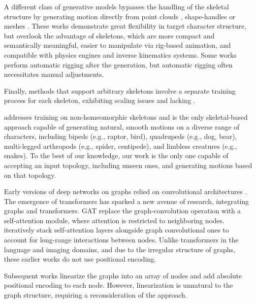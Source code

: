 A different class of generative models bypasses the handling of the skeletal structure by generating motion directly from point clouds \cite{mo2025motion}, shape-handles \cite{zhang2023tapmo} or meshes \cite{song2023unsupervised,ye2024skinned,muralikrishnan2025temporal,zhang2024dnf}. These works demonstrate great flexibility in target character structure, but overlook the advantage of skeletons, which are more compact and semantically meaningful, easier to manipulate via rig-based animation, and compatible with physics engines \cite{tevet2024closd} and inverse kinematics systems. Some works \cite{wang2024mmr} perform automatic rigging after the generation, but automatic rigging often necessitates manual adjustments.

Finally, methods that support arbitrary skeletons \cite{raab2024single,li2022ganimator} involve a separate training process for each skeleton, exhibiting scaling issues and lacking \Crossgen.

\algoname addresses training on non-homeomorphic skeletons and is the only skeletal-based approach capable of generating natural, smooth motions on a diverse range of characters, including bipeds (e.g., raptor, bird), quadrupeds (e.g., dog, bear), multi-legged arthropods (e.g., spider, centipede), and limbless creatures (e.g., snakes). To the best of our knowledge, our work is the only one capable of accepting an input topology, including unseen ones, and generating motions based on that topology.









Early versions of deep networks on graphs relied on convolutional architectures \cite{kipf2016semi}. The emergence of transformers has sparked a new avenue of research, integrating graphs and transformers.
GAT \cite{velivckovic2017graph}
replace the graph-convolution operation with a self-attention module, where attention is restricted to neighboring nodes. \citet{rong2020self} iteratively stack self-attention layers alongside graph convolutional ones to account for long-range interactions between nodes.
Unlike transformers in the language and imaging domains, and due to the irregular structure of graphs, these earlier works do not use positional encoding.

Subsequent works \cite{dwivedi2021generalization,kreuzer2021rethinking} linearize the graphs into an array of nodes and add absolute positional encoding to each node.
However, linearization is unnatural to the graph structure, requiring a reconsideration of the approach.


